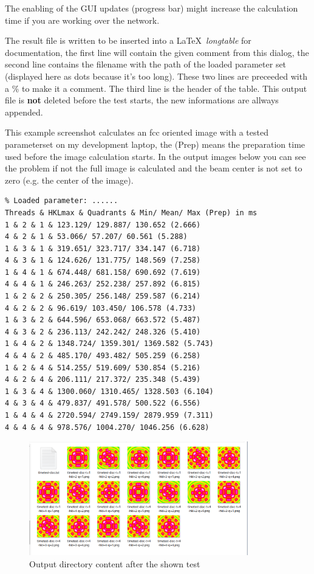 \documentclass[11pt]{article} %
\begin{document}
The enabling of the GUI updates (progress bar) might increase the calculation time if you are working over the network.

The result file is written to be inserted into a \LaTeX\  {\it longtable} for documentation, the first line will contain the given comment from this dialog, the second line contains the filename with the path of the loaded parameter set (displayed here as dots because it's too long). These two lines are preceeded with a \% to make it a comment. The third line is the header of the table. This output file is {\bf not} deleted before the test starts, the new informations are allways appended.

This example screenshot calculates an fcc oriented image with a tested parameterset on my development laptop, the (Prep) means the preparation time used before the image calculation starts. In the output images below you can see the problem if not the full image is calculated and the beam center is not set to zero (e.g. the center of the image).

\begin{lstlisting}[frame=single, xleftmargin=1cm, xrightmargin=1cm]
% FCC oriented test
% Loaded parameter: ......
Threads & HKLmax & Quadrants & Min/ Mean/ Max (Prep) in ms
1 & 2 & 1 & 123.129/ 129.887/ 130.652 (2.666)
4 & 2 & 1 & 53.066/ 57.207/ 60.561 (5.288)
1 & 3 & 1 & 319.651/ 323.717/ 334.147 (6.718)
4 & 3 & 1 & 124.626/ 131.775/ 148.569 (7.258)
1 & 4 & 1 & 674.448/ 681.158/ 690.692 (7.619)
4 & 4 & 1 & 246.263/ 252.238/ 257.892 (6.815)
1 & 2 & 2 & 250.305/ 256.148/ 259.587 (6.214)
4 & 2 & 2 & 96.619/ 103.450/ 106.578 (4.733)
1 & 3 & 2 & 644.596/ 653.068/ 663.572 (5.487)
4 & 3 & 2 & 236.113/ 242.242/ 248.326 (5.410)
1 & 4 & 2 & 1348.724/ 1359.301/ 1369.582 (5.743)
4 & 4 & 2 & 485.170/ 493.482/ 505.259 (6.258)
1 & 2 & 4 & 514.255/ 519.609/ 530.854 (5.216)
4 & 2 & 4 & 206.111/ 217.372/ 235.348 (5.439)
1 & 3 & 4 & 1300.060/ 1310.465/ 1328.503 (6.104)
4 & 3 & 4 & 479.837/ 491.578/ 500.522 (6.556)
1 & 4 & 4 & 2720.594/ 2749.159/ 2879.959 (7.311)
4 & 4 & 4 & 978.576/ 1004.270/ 1046.256 (6.628)
\end{lstlisting}
\begin{figure}[H]
 \centering
 \includegraphics[width=0.85\textwidth]{timing_test_out.png}
 \caption{Output directory content after the shown test}
 \label{fig:imagemeta}
\end{figure}
\end{document}
